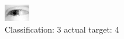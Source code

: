 \begin{figure}[h!]
\begin{center}
\includegraphics[width=0.60\columnwidth]{figures/ID2493_class_3_target_4.png}
\end{center}
\caption{ Classification: 3 actual target: 4}
\label{fig:ID2493_class_3_target_4}
\end{figure}
